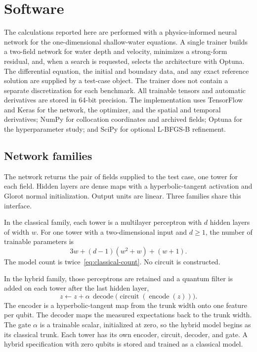 \documentclass[11pt]{article}
\begin{document}
\section{Software}
\label{sec:software}

The calculations reported here are performed with a physics-informed neural
network for the one-dimensional shallow-water equations. A single trainer
builds a two-field network for water depth and velocity, minimizes a
strong-form residual, and, when a search is requested, selects the
architecture with Optuna. The differential equation, the initial and
boundary data, and any exact reference solution are supplied by a test-case
object. The trainer does not contain a separate discretization for each
benchmark. All trainable tensors and automatic derivatives are stored in
64-bit precision. The implementation uses TensorFlow and Keras for the
network, the optimizer, and the spatial and temporal derivatives; NumPy for
collocation coordinates and archived fields; Optuna for the hyperparameter
study; and SciPy for optional L-BFGS-B refinement.

\subsection{Network families}
\label{sec:families}

The network returns the pair of fields supplied to the test case, one
tower for each field. Hidden layers are
dense maps with a hyperbolic-tangent activation and Glorot normal
initialization. Output units are linear. Three families share this
interface.

In the classical family, each tower is a multilayer perceptron with \(d\)
hidden layers of width \(w\). For one tower with a two-dimensional input
and \(d\ge 1\), the number of trainable parameters is
\begin{equation}
\label{eq:classical-count}
3w + (d-1)(w^{2}+w) + (w+1).
\end{equation}
The model count is twice~\eqref{eq:classical-count}. No circuit is
constructed.

In the hybrid family, those perceptrons are retained and a quantum filter
is added on each tower after the last hidden layer,
\begin{equation}
\label{eq:hybrid}
z \leftarrow z + \alpha\,
\operatorname{decode}\!\big(\operatorname{circuit}(\operatorname{encode}(z))\big).
\end{equation}
The encoder is a hyperbolic-tangent map from the trunk width onto one
feature per qubit. The decoder maps the measured expectations back to the
trunk width. The gate \(\alpha\) is a trainable scalar, initialized at
zero, so the hybrid model begins as its classical trunk. Each tower has
its own encoder, circuit, decoder, and gate. A hybrid specification with
zero qubits is stored and trained as a classical model.
\end{document}
